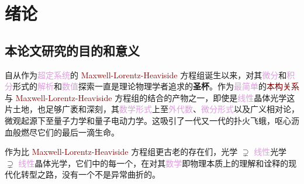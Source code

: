 
\label{第一章开始}
\chapter{绪论}

\section{本论文研究的目的和意义}\label{sec:ttttt}

自从作为\textcolor{Plum}{超定系统}的 \textcolor{Maroon}{Maxwell-Lorentz-Heaviside} 方程组诞生以来，对其\textcolor{Plum}{微分}和\textcolor{Plum}{积分}形式的\textcolor{Plum}{解析}和\textcolor{Plum}{数值}探索一直是\textcolor{NavyBlue}{理论物理学者}追求的\textbf{圣杯}\cite{olyslagerElectromagneticsExoticMedia2002}。作为\textcolor{Plum}{最简单}的\textcolor{Maroon}{本构关系}与 \textcolor{Maroon}{Maxwell-Lorentz-Heaviside} 方程组的结合的产物之一，即使是\textcolor{Plum}{线性}\textcolor{PineGreen}{晶体光学}这片土地，也足够广袤和深刻，其\textcolor{Plum}{数学形式}上至\textcolor{Plum}{外代数}、\textcolor{Plum}{微分形式}以及\textcolor{NavyBlue}{广义相对论}\cite{yakovNonbirefringenceConditionsSpacetime2005,hehlSpacetimeMetricLocal2006,frankelGeometryPhysicsIntroduction2011,dahlNondissipativeElectromagneticMedium2013,ivezicManifestlyCovariantAharonovbohm2015,hehlAxionDilatonMetric2016,favaroRecentAdvancesClassical2012}，\textcolor{NavyBlue}{微观起源}下至\textcolor{NavyBlue}{量子力学}\cite{nelsonMechanismsDispersionCrystalline1989,nelsonDerivingTransmissionReflection1995,nelsonLagrangianTreatmentMagnetic1994,nelsonOpticallyActiveSurface2000}和\textcolor{NavyBlue}{量子电动力学}\cite{eimerlQuantumElectrodynamicsOptical1988}。这吸引了一代又一代的扑火飞蛾，呕心沥血般燃尽它们的最后一滴生命。

作为比 \textcolor{Maroon}{Maxwell-Lorentz-Heaviside} 方程组更古老的存在们，光学 $\supsetneq$ \textcolor{Plum}{线性}\textcolor{NavyBlue}{光学} $\supsetneq$ \textcolor{Plum}{线性}\textcolor{PineGreen}{晶体光学}，它们中的每一个，在对其\textcolor{Plum}{数学}即\textcolor{NavyBlue}{物理本质}上的理解和诠释的现代化转型之路，没有一个不是异常曲折的。


